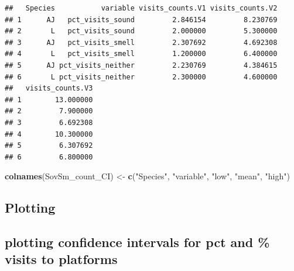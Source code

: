 \documentclass[]{article}
\newenvironment{Shaded}{\begin{snugshade}}{\end{snugshade}}
\newcommand{\KeywordTok}[1]{\textcolor[rgb]{0.13,0.29,0.53}{\textbf{{#1}}}}
\newcommand{\StringTok}[1]{\textcolor[rgb]{0.31,0.60,0.02}{{#1}}}
\newcommand{\NormalTok}[1]{{#1}}
\begin{document}
\begin{verbatim}
##   Species           variable visits_counts.V1 visits_counts.V2
## 1      AJ   pct_visits_sound         2.846154         8.230769
## 2       L   pct_visits_sound         2.000000         5.300000
## 3      AJ   pct_visits_smell         2.307692         4.692308
## 4       L   pct_visits_smell         1.200000         6.400000
## 5      AJ pct_visits_neither         2.230769         4.384615
## 6       L pct_visits_neither         2.300000         4.600000
##   visits_counts.V3
## 1        13.000000
## 2         7.900000
## 3         6.692308
## 4        10.300000
## 5         6.307692
## 6         6.800000
\end{verbatim}

\begin{Shaded}
\begin{Highlighting}[]
\KeywordTok{colnames}\NormalTok{(SovSm_count_CI) <-}\StringTok{ }\KeywordTok{c}\NormalTok{(}\StringTok{"Species"}\NormalTok{, }\StringTok{"variable"}\NormalTok{, }\StringTok{"low"}\NormalTok{, }\StringTok{"mean"}\NormalTok{, }\StringTok{"high"}\NormalTok{)}
\end{Highlighting}
\end{Shaded}

\subsection{Plotting}\label{plotting-2}

\subsection{plotting confidence intervals for pct and \% visits to
platforms}\label{plotting-confidence-intervals-for-pct-and-visits-to-platforms-1}
\end{document}
